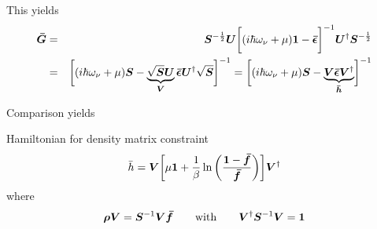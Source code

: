 \documentclass[11pt,a4paper]{report}
\begin{document}
This yields
\begin{eqnarray}
\bm{\bar{G}}
&=&\bm{S}^{-\frac{1}{2}}\bm{U}\biggl[(i\hbar\omega_\nu+\mu)\bm{1}
-\bm{\bar{\epsilon}}\biggr]^{-1}\bm{U}^\dagger\bm{S}^{-\frac{1}{2}}
\nonumber\\
&=&\biggl[(i\hbar\omega_\nu+\mu)\bm{S}
-\underbrace{\sqrt{\bm{S}}\bm{U}}_{\bm{V}}\bm{\bar{\epsilon}}\bm{U}^\dagger\sqrt{\bm{S}}\biggr]^{-1}
=\biggl[(i\hbar\omega_\nu+\mu)\bm{S}
-\underbrace{\bm{V}\bm{\bar{\epsilon}}\bm{V}^\dagger}_{\bm{\bar{h}}}\biggr]^{-1}
\end{eqnarray}

Comparison yields
\begin{myshadowminipage}{Hamiltonian for density matrix constraint}
\begin{eqnarray}
\bar{h}=\bm{V}\biggl[\mu\bm{1}+\frac{1}{\beta}
\ln\left(\frac{\bm{1}-\bm{\bar{f}}}{\bm{\bar{f}}}\right)\biggr]
\bm{V}^\dagger
  \end{eqnarray}
where
\begin{eqnarray}
\bm{\rho}\bm{V}=\bm{S}^{-1}\bm{V}\bm{\bar{f}}
\qquad\text{with}\qquad
\bm{V}^\dagger\bm{S}^{-1}\bm{V}=\bm{1}
\end{eqnarray}
\end{myshadowminipage}



\end{document}
